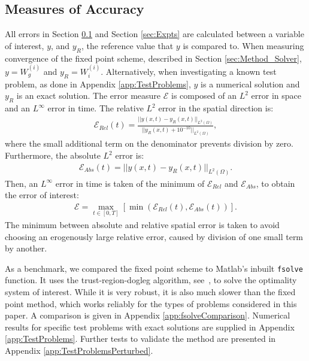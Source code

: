 \subsection{Measures of Accuracy}\label{sec:Method_Validation}


All errors in Section \ref{sec:Method_Validation} and Section \ref{sec:Expts} are calculated between a variable of interest, $y$, and $y_R$, the reference value that $y$ is compared to. When measuring convergence of the fixed point scheme, described in Section \ref{sec:Method_Solver}, $y = W^{(i)}_g$ and $y_R = W^{(i)}_i$. Alternatively, when investigating a known test problem, as done in Appendix \ref{app:TestProblems}, $y$ is a numerical solution and $y_R$ is an exact solution. The error measure $\mathcal{E}$ is composed of an $L^2$ error in space and an $L^\infty$ error in time. The relative $L^2$ error in the spatial direction is:
\begin{align*}
\mathcal{E}_{Rel}(t) = \frac{|| y(x,t) - y_{R}(x,t)||_{L^2(\Omega)} }{||y_R(x,t) + 10^{-10}||_{L^2(\Omega)}},
\end{align*}
where the small additional term on the denominator prevents division by zero.
Furthermore, the absolute $L^2$ error is:
\begin{align*}
\mathcal{E}_{Abs}(t) = || y(x,t) - y_R(x,t)||_{L^2(\Omega)}.
\end{align*}
Then, an $L^\infty$ error in time is taken of the minimum of $\mathcal{E}_{Rel}$ and $\mathcal{E}_{Abs}$, to obtain the error of interest:
\begin{align*}
\mathcal{E} = \max_{t \in [0,T]}\left[\min\left(\mathcal{E}_{Rel}(t), \mathcal{E}_{Abs}(t)\right)\right].
\end{align*}
The minimum between absolute and relative spatial error is taken to avoid choosing an erogenously large relative error, caused by division of one small term by another.

As a benchmark, we compared the fixed point scheme to Matlab's inbuilt \texttt{fsolve} function. It uses the trust-region-dogleg algorithm, see~\cite{Powell1}, to solve the optimality system of interest. While it is very robust, it is also much slower than the fixed point method, which works reliably for the types of problems considered in this paper. A comparison is given in Appendix \ref{app:fsolveComparison}. Numerical results for specific test problems with exact solutions are supplied in Appendix \ref{app:TestProblems}. Further tests to validate the method are presented in Appendix \ref{app:TestProblemsPerturbed}.
